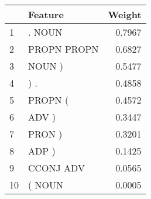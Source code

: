 \begin{tabular}{llr}
\toprule
{} &      Feature &  Weight \\
\midrule
1  &       . NOUN &  0.7967 \\
2  &  PROPN PROPN &  0.6827 \\
3  &       NOUN ) &  0.5477 \\
4  &          ) . &  0.4858 \\
5  &      PROPN ( &  0.4572 \\
6  &        ADV ) &  0.3447 \\
7  &       PRON ) &  0.3201 \\
8  &        ADP ) &  0.1425 \\
9  &    CCONJ ADV &  0.0565 \\
10 &       ( NOUN &  0.0005 \\
\bottomrule
\end{tabular}
